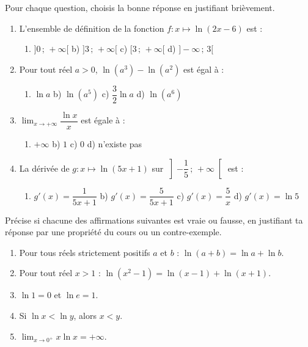 \documentclass[11pt]{article}
\begin{document}
\begin{exercice}
Pour chaque question, choisis la bonne réponse en justifiant brièvement.
\begin{enumerate}
\item L'ensemble de définition de la fonction $f : x \longmapsto \ln(2x-6)$ est :
\begin{enumerate}
\item[a)] $]0\,;\,+\infty[$ \quad b) $]3\,;\,+\infty[$ \quad c) $[3\,;\,+\infty[$ \quad d) $]-\infty\,;\,3[$
\end{enumerate}
\item Pour tout réel $a > 0$, $\ln(a^3) - \ln(a^2)$ est égal à :
\begin{enumerate}
\item[a)] $\ln a$ \quad b) $\ln(a^5)$ \quad c) $\dfrac{3}{2}\ln a$ \quad d) $\ln(a^6)$
\end{enumerate}
\item $\displaystyle\lim_{x \to +\infty} \dfrac{\ln x}{x}$ est égale à :
\begin{enumerate}
\item[a)] $+\infty$ \quad b) $1$ \quad c) $0$ \quad d) n'existe pas
\end{enumerate}
\item La dérivée de $g : x \longmapsto \ln(5x+1)$ sur $\left]-\dfrac{1}{5}\,;\,+\infty\right[$ est :
\begin{enumerate}
\item[a)] $g'(x) = \dfrac{1}{5x+1}$ \quad b) $g'(x) = \dfrac{5}{5x+1}$ \quad c) $g'(x) = \dfrac{5}{x}$ \quad d) $g'(x) = \ln 5$
\end{enumerate}
\end{enumerate}
\end{exercice}

\begin{exercice}
Précise si chacune des affirmations suivantes est vraie ou fausse, en justifiant ta réponse par une propriété du cours ou un contre-exemple.
\begin{enumerate}
\item Pour tous réels strictement positifs $a$ et $b$ : $\ln(a+b) = \ln a + \ln b$.
\item Pour tout réel $x > 1$ : $\ln(x^2 - 1) = \ln(x-1) + \ln(x+1)$.
\item $\ln 1 = 0$ et $\ln e = 1$.
\item Si $\ln x < \ln y$, alors $x < y$.
\item $\displaystyle\lim_{x \to 0^+} x \ln x = +\infty$.
\end{enumerate}
\end{exercice}
\end{document}
